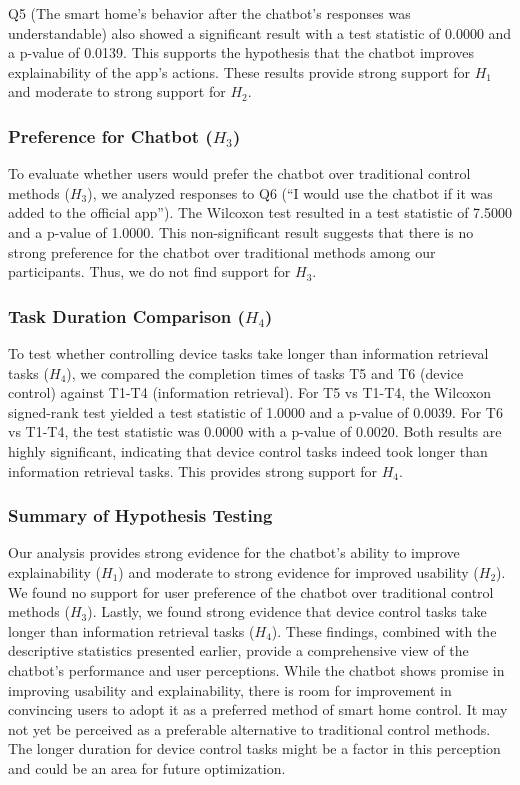 Q5 (The smart home's behavior after the chatbot's responses was understandable) also showed a significant result with a test statistic of 0.0000 and a p-value of 0.0139. This supports the hypothesis that the chatbot improves explainability of the app's actions.
These results provide strong support for \(H_1\) and moderate to strong support for \(H_2\).
\subsubsection{Preference for Chatbot (\(H_3\))}
To evaluate whether users would prefer the chatbot over traditional control methods (\(H_3\)), we analyzed responses to Q6 (``I would use the chatbot if it was added to the official app''). The Wilcoxon test resulted in a test statistic of 7.5000 and a p-value of 1.0000. This non-significant result suggests that there is no strong preference for the chatbot over traditional methods among our participants. Thus, we do not find support for \(H_3\).
\subsubsection{Task Duration Comparison (\(H_4\))}
To test whether controlling device tasks take longer than information retrieval tasks (\(H_4\)), we compared the completion times of tasks T5 and T6 (device control) against T1-T4 (information retrieval).
For T5 vs T1-T4, the Wilcoxon signed-rank test yielded a test statistic of 1.0000 and a p-value of 0.0039. For T6 vs T1-T4, the test statistic was 0.0000 with a p-value of 0.0020. Both results are highly significant, indicating that device control tasks indeed took longer than information retrieval tasks. This provides strong support for \(H_4\).
\subsubsection{Summary of Hypothesis Testing}
Our analysis provides strong evidence for the chatbot's ability to improve explainability (\(H_1\)) and moderate to strong evidence for improved usability (\(H_2\)). We found no support for user preference of the chatbot over traditional control methods (\(H_3\)). Lastly, we found strong evidence that device control tasks take longer than information retrieval tasks (\(H_4\)).
These findings, combined with the descriptive statistics presented earlier, provide a comprehensive view of the chatbot's performance and user perceptions. While the chatbot shows promise in improving usability and explainability, there is room for improvement in convincing users to adopt it as a preferred method of smart home control. It may not yet be perceived as a preferable alternative to traditional control methods. The longer duration for device control tasks might be a factor in this perception and could be an area for future optimization.


